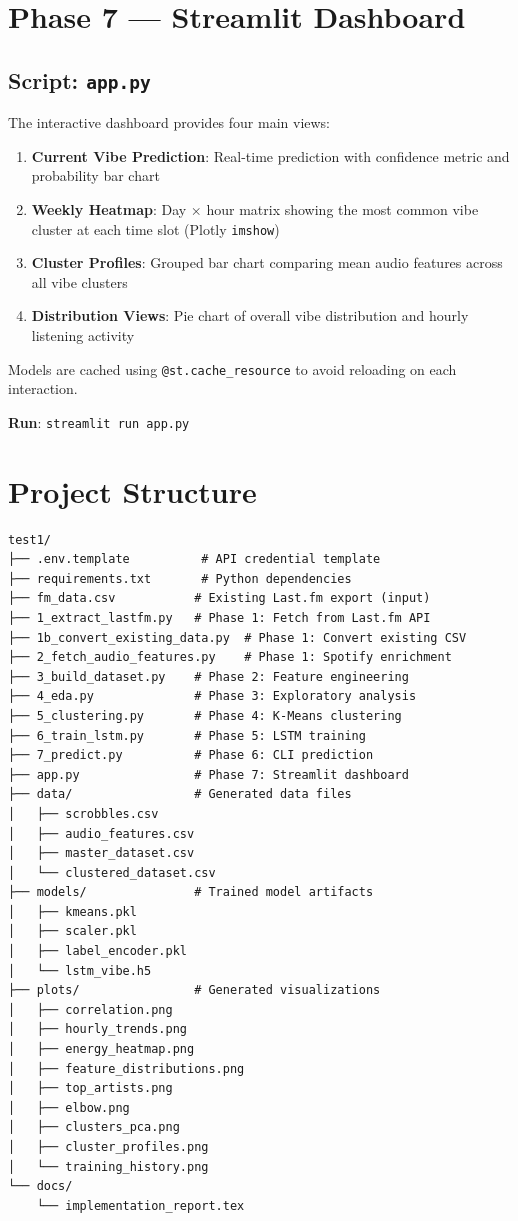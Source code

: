 \documentclass[12pt, a4paper]{article}
\begin{document}
\section{Phase 7 — Streamlit Dashboard}

\subsection{Script: \texttt{app.py}}

The interactive dashboard provides four main views:

\begin{enumerate}
    \item \textbf{Current Vibe Prediction}: Real-time prediction with confidence metric and probability bar chart
    \item \textbf{Weekly Heatmap}: Day $\times$ hour matrix showing the most common vibe cluster at each time slot (Plotly \texttt{imshow})
    \item \textbf{Cluster Profiles}: Grouped bar chart comparing mean audio features across all vibe clusters
    \item \textbf{Distribution Views}: Pie chart of overall vibe distribution and hourly listening activity
\end{enumerate}

Models are cached using \texttt{@st.cache\_resource} to avoid reloading on each interaction.

\textbf{Run}: \texttt{streamlit run app.py}

\section{Project Structure}

\begin{verbatim}
test1/
├── .env.template          # API credential template
├── requirements.txt       # Python dependencies
├── fm_data.csv           # Existing Last.fm export (input)
├── 1_extract_lastfm.py   # Phase 1: Fetch from Last.fm API
├── 1b_convert_existing_data.py  # Phase 1: Convert existing CSV
├── 2_fetch_audio_features.py    # Phase 1: Spotify enrichment
├── 3_build_dataset.py    # Phase 2: Feature engineering
├── 4_eda.py              # Phase 3: Exploratory analysis
├── 5_clustering.py       # Phase 4: K-Means clustering
├── 6_train_lstm.py       # Phase 5: LSTM training
├── 7_predict.py          # Phase 6: CLI prediction
├── app.py                # Phase 7: Streamlit dashboard
├── data/                 # Generated data files
│   ├── scrobbles.csv
│   ├── audio_features.csv
│   ├── master_dataset.csv
│   └── clustered_dataset.csv
├── models/               # Trained model artifacts
│   ├── kmeans.pkl
│   ├── scaler.pkl
│   ├── label_encoder.pkl
│   └── lstm_vibe.h5
├── plots/                # Generated visualizations
│   ├── correlation.png
│   ├── hourly_trends.png
│   ├── energy_heatmap.png
│   ├── feature_distributions.png
│   ├── top_artists.png
│   ├── elbow.png
│   ├── clusters_pca.png
│   ├── cluster_profiles.png
│   └── training_history.png
└── docs/
    └── implementation_report.tex
\end{verbatim}
\end{document}
